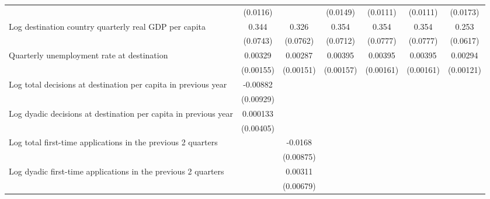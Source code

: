 \begin{table}[htbp]
\begin{tabular}{l*{6}{c}}
                    &    (0.0116)         &                     &    (0.0149)         &    (0.0111)         &    (0.0111)         &    (0.0173)         \\
[1em]
Log destination country quarterly real GDP per capita&       0.344\sym{***}&       0.326\sym{***}&       0.354\sym{***}&       0.354\sym{***}&       0.354\sym{***}&       0.253\sym{***}\\
                    &    (0.0743)         &    (0.0762)         &    (0.0712)         &    (0.0777)         &    (0.0777)         &    (0.0617)         \\
[1em]
Quarterly unemployment rate at destination&     0.00329\sym{*}  &     0.00287         &     0.00395\sym{*}  &     0.00395\sym{*}  &     0.00395\sym{*}  &     0.00294\sym{*}  \\
                    &   (0.00155)         &   (0.00151)         &   (0.00157)         &   (0.00161)         &   (0.00161)         &   (0.00121)         \\
[1em]
Log total decisions at destination per capita in previous year&    -0.00882         &                     &                     &                     &                     &                     \\
                    &   (0.00929)         &                     &                     &                     &                     &                     \\
[1em]
Log dyadic decisions at destination per capita in previous year&    0.000133         &                     &                     &                     &                     &                     \\
                    &   (0.00405)         &                     &                     &                     &                     &                     \\
[1em]
Log total first-time applications in the previous 2 quarters&                     &     -0.0168         &                     &                     &                     &                     \\
                    &                     &   (0.00875)         &                     &                     &                     &                     \\
[1em]
Log dyadic first-time applications in the previous 2 quarters&                     &     0.00311         &                     &                     &                     &                     \\
                    &                     &   (0.00679)         &                     &                     &                     &                     \\

\end{tabular}
\end{table}
